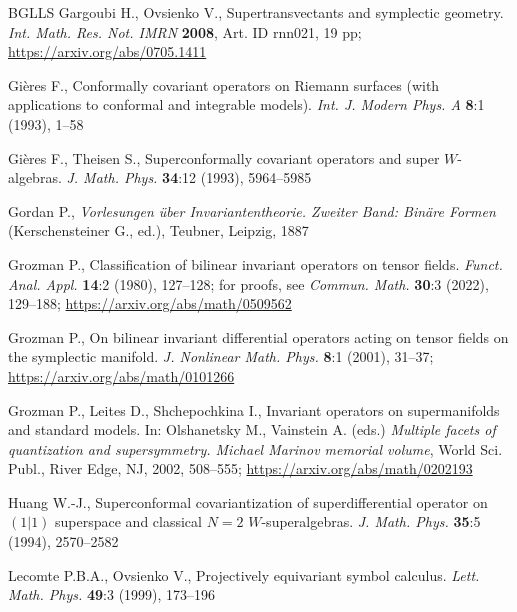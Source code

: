 \documentclass[12pt,a4paper]{amsart}
\theoremstyle{thm}
\theoremstyle{definition}
\begin{document}
\begin{thebibliography}{BGLLS}
Gargoubi H., Ovsienko V., Supertransvectants and symplectic geometry.
\textit{Int. Math. Res. Not. IMRN} \textbf{2008}, Art. ID rnn021, 19 pp;
\url{https://arxiv.org/abs/0705.1411}

Gi\`eres F., Conformally covariant operators on Riemann surfaces \textup{(}with applications to
conformal and integrable models\textup{)}. \textit{Int. J. Modern Phys. A} \textbf{8}:1
(1993), 1--58

Gi\`eres F., Theisen S., Superconformally covariant operators and super $W$-algebras.
\textit{J. Math. Phys.} \textbf{34}:12 (1993), 5964--5985

Gordan P., \textit{Vorlesungen \"uber Invariantentheorie. Zweiter Band: Bin\"are Formen}
(Kerschensteiner G., ed.), Teubner, Leipzig, 1887

Grozman P., Classification of bilinear invariant operators on tensor
fields. \textit{Funct. Anal. Appl.} \textbf{14}:2 (1980), 127--128; for
proofs, see \textit{Commun. Math.} \textbf{30}:3 (2022), 129--188;
\url{https://arxiv.org/abs/math/0509562}

Grozman P., On bilinear invariant differential operators acting on
tensor fields on the symplectic manifold. \textit{J. Nonlinear Math. Phys.} \textbf{8}:1
(2001), 31--37; \url{https://arxiv.org/abs/math/0101266}

Grozman P., Leites D., Shchepochkina I., Invariant operators
on supermanifolds and standard models. In: Olshanetsky M., Vainstein A. (eds.)
\textit{Multiple facets of quantization and supersymmetry. Michael Marinov memorial volume},
World Sci. Publ., River Edge, NJ, 2002, 508--555; \url{https://arxiv.org/abs/math/0202193}

Huang W.-J., Superconformal covariantization of superdifferential operator on $(1|1)$
superspace and classical $N=2$ $W$-superalgebras. \textit{J. Math. Phys.} \textbf{35}:5
(1994), 2570--2582



Lecomte P.B.A., Ovsienko V., Projectively equivariant symbol calculus.
\textit{Lett. Math. Phys.} \textbf{49}:3 (1999), 173--196


\end{thebibliography}
\end{document}
